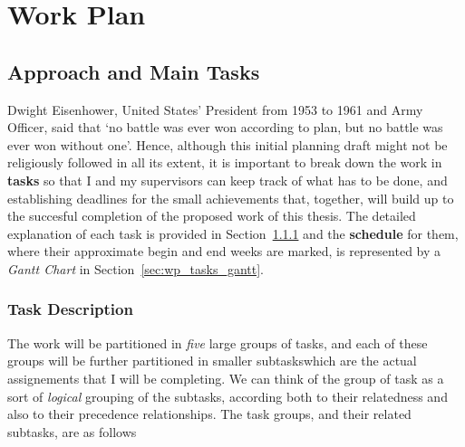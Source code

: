 \chapter{Work Plan}\label{chap:workPlan}

\section{Approach and  Main Tasks}
Dwight Eisenhower, United States' President from 1953 to 1961 and Army Officer, said that `no battle was ever won according to plan, but no battle was ever won without one'. Hence, although this initial planning draft might not be religiously followed in all its extent, it is important to break down the work in \textbf{tasks} so that I and my supervisors can keep track of what has to be done, and establishing deadlines for the small achievements that, together, will build up to the succesful completion of the proposed work of this thesis. The detailed explanation of each task is provided in Section~\ref{sec:wp_tasks_td} and the \textbf{schedule} for them, where their approximate begin and end weeks are marked, is represented by a \emph{Gantt Chart} in Section~\ref{sec:wp_tasks_gantt}.

\subsection{Task Description}\label{sec:wp_tasks_td}
The work will be partitioned in \emph{five} large groups of tasks, and each of these groups will be further partitioned in smaller subtaskswhich are the actual assignements that I will be completing. We can think of the group of task as a sort of \emph{logical} grouping of the subtasks, according both to their relatedness and also to their precedence relationships. The task groups, and their related subtasks, are as follows

